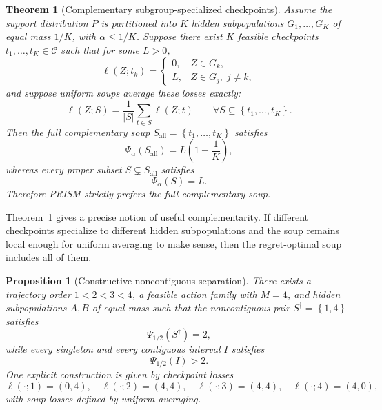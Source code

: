 \documentclass{article}
\newtheorem{theorem}{Theorem}
\newtheorem{proposition}{Proposition}
\newcommand{\cC}{\mathcal{C}}
\newcommand{\prism}{\textup{\textsc{PRISM}}}
\newcommand{\braces}[1]{\left\{ #1 \right\}}
\newcommand{\paren}[1]{\left( #1 \right)}
\newcommand{\loss}{\ell}
\newcommand{\1}{\mathbbm{1}}
\begin{document}
\begin{theorem}[Complementary subgroup-specialized checkpoints]
\label{thm:complementarity}
Assume the support distribution \(P\) is partitioned into \(K\) hidden subpopulations \(G_1,\ldots,G_K\) of equal mass \(1/K\), with \(\alpha \le 1/K\). Suppose there exist \(K\) feasible checkpoints \(t_1,\ldots,t_K\in\cC\) such that for some \(L>0\),
\begin{equation}
    \loss(Z;t_k)
    =
    \begin{cases}
        0, & Z\in G_k,\\
        L, & Z\in G_j,\; j\neq k,
    \end{cases}
    \label{eq:specialized_losses}
\end{equation}
and suppose uniform soups average these losses exactly:
\begin{equation}
    \loss(Z;S)
    =
    \frac{1}{|S|}
    \sum_{t\in S} \loss(Z;t)
    \qquad \forall S\subseteq\braces{t_1,\ldots,t_K}.
    \label{eq:exact_soup_average}
\end{equation}
Then the full complementary soup \(S_{\mathrm{all}}=\braces{t_1,\ldots,t_K}\) satisfies
\begin{equation}
    \Psi_\alpha(S_{\mathrm{all}})
    =
    L\paren{1-\frac{1}{K}},
    \label{eq:full_soup_regret}
\end{equation}
whereas every proper subset \(S\subsetneq S_{\mathrm{all}}\) satisfies
\begin{equation}
    \Psi_\alpha(S)=L.
    \label{eq:incomplete_soup_regret}
\end{equation}
Therefore \prism{} strictly prefers the full complementary soup.
\end{theorem}

Theorem~\ref{thm:complementarity} gives a precise notion of useful complementarity. If different checkpoints specialize to different hidden subpopulations and the soup remains local enough for uniform averaging to make sense, then the regret-optimal soup includes all of them.

\begin{proposition}[Constructive noncontiguous separation]
\label{prop:noncontiguous}
There exists a trajectory order \(1<2<3<4\), a feasible action family with \(M=4\), and hidden subpopulations \(A,B\) of equal mass such that the noncontiguous pair \(S^\dagger = \braces{1,4}\) satisfies
\begin{equation}
    \Psi_{1/2}(S^\dagger)=2,
    \label{eq:noncontig_value}
\end{equation}
while every singleton and every contiguous interval \(I\) satisfies
\begin{equation}
    \Psi_{1/2}(I) > 2.
    \label{eq:interval_worse}
\end{equation}
One explicit construction is given by checkpoint losses
\begin{equation}
    \loss(\cdot;1)=(0,4),\quad
    \loss(\cdot;2)=(4,4),\quad
    \loss(\cdot;3)=(4,4),\quad
    \loss(\cdot;4)=(4,0),
    \label{eq:noncontiguous_example}
\end{equation}
with soup losses defined by uniform averaging.
\end{proposition}
\end{document}
